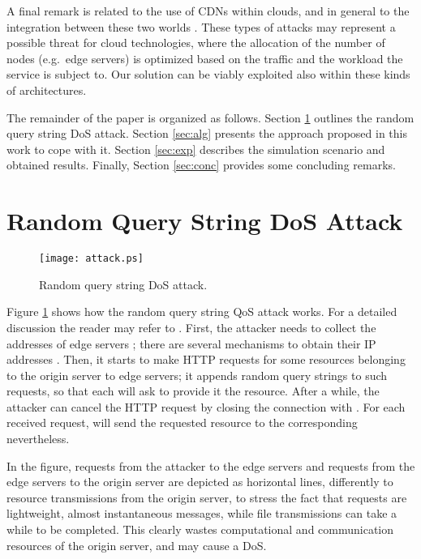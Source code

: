 \documentclass{IEEEtran}
\begin{document}
A final remark is related to the use of CDNs within clouds, and in general to the integration between these two worlds \cite{Broberg:2009,Chiu:2010}. These types of attacks may represent a possible threat for cloud technologies, where the allocation of the number of nodes (e.g.~edge servers) is optimized based on the traffic and the workload the service is subject to. Our solution can be viably exploited also within these kinds of architectures.

The remainder of the paper is organized as follows. Section \ref{sec:attack} outlines the random query string DoS attack. Section \ref{sec:alg} presents the approach proposed in this work to cope with it. Section \ref{sec:exp} describes the simulation scenario and obtained results.
Finally, Section \ref{sec:conc} provides some concluding remarks.

\section{Random Query String DoS Attack}
\label{sec:attack}

\begin{figure}[t]
   \centering
   \texttt{[image: attack.ps]}
   \caption{Random query string DoS attack.}
   \label{fig:attack}
\end{figure}

Figure \ref{fig:attack} shows how the random query string QoS attack works. For a detailed discussion the reader may refer to \cite{original}. First, the attacker needs to collect the addresses of edge servers ; there are several mechanisms to obtain their IP addresses \cite{Su:2006,original}. Then, it starts to make HTTP requests for some resources belonging to the origin server  to edge servers; it appends random query strings to such requests, so that each  will ask  to provide it the resource. After a while, the attacker can cancel the HTTP request by closing the connection with . For each received request,  will send the requested resource to the corresponding  nevertheless.

In the figure, requests from the attacker to the edge servers and requests from the edge servers to the origin server are depicted as horizontal lines, differently to resource transmissions from the origin server, to stress the fact that requests are lightweight, almost instantaneous messages, while file transmissions can take a while to be completed. This clearly wastes computational and communication resources of the origin server, and may cause a DoS.
\end{document}
